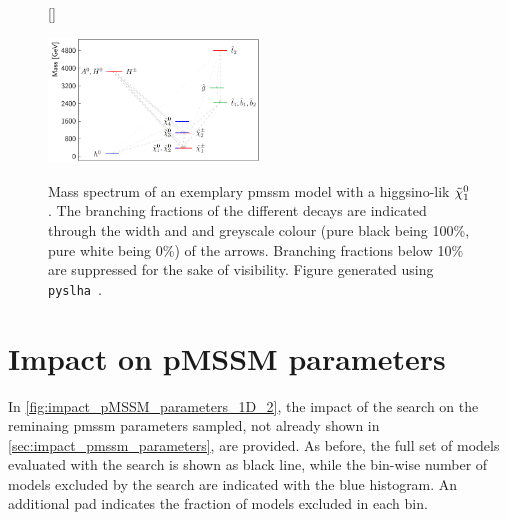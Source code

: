 \begin{figure}[h]
[\FBwidth]
{\caption{Mass spectrum of an exemplary \gls{pmssm} model with a higgsino-lik $\tilde{\chi}_1^0$. The branching fractions of the different decays are indicated through the width and and greyscale colour (pure black being 100\%, pure white being 0\%) of the arrows. Branching fractions below 10\% are suppressed for the sake of visibility. Figure generated using \texttt{pyslha}~\cite{pyslha:2013jua}.}\label{fig:higgsino_spectrum}}
{\includegraphics[width=0.50\textwidth]{thesis_plot_6898.pdf}}
\end{figure}

\FloatBarrier

\section{Impact on pMSSM parameters}

In \cref{fig:impact_pMSSM_parameters_1D_2}, the impact of the \onelepton search on the reminaing \gls{pmssm} parameters sampled, not already shown in \cref{sec:impact_pmssm_parameters}, are provided. As before, the full set of models evaluated with the \onelepton search is shown as black line, while the bin-wise number of models excluded by the search are indicated with the blue histogram. An additional pad indicates the fraction of models excluded in each bin.

